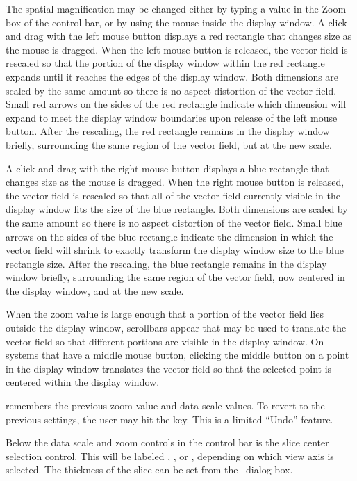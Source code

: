 The spatial magnification may be changed either by typing a value in the
Zoom box of the control bar, or by using the mouse inside the display
window.  A click and drag with the left mouse button displays a red
rectangle that changes size as the mouse is dragged.  When the left
mouse button is released, the vector field is rescaled so that the
portion of the display window within the red rectangle expands until it
reaches the edges of the display window.  Both dimensions are scaled by
the same amount so there is no aspect distortion of the vector field.
Small red arrows on the sides of the red rectangle indicate which
dimension will expand to meet the display window boundaries upon release
of the left mouse button.  After the rescaling, the red rectangle
remains in the display window briefly, surrounding the same region of
the vector field, but at the new scale.

A click and drag with the right mouse button displays a blue rectangle
that changes size as the mouse is dragged.  When the right mouse button
is released, the vector field is rescaled so that all of the vector
field currently visible in the display window fits the size of the
blue rectangle.  Both dimensions are scaled by the same amount so there
is no aspect distortion of the vector field.  Small blue arrows on the
sides of the blue rectangle indicate the dimension in which the vector
field will shrink to exactly transform the display window size to the
blue rectangle size.  After the rescaling, the blue rectangle remains in
the display window briefly, surrounding the same region of the vector
field, now centered in the display window, and at the new scale.

When the zoom value is large enough that a portion of the vector field
lies outside the display window, scrollbars appear that may be used to
translate the vector field so that different portions are visible in the
display window.  On systems that have a middle mouse button, clicking
the middle button on a point in the display window translates the vector
field so that the selected point is centered within the display window.

 remembers the previous zoom value and data scale values.
To revert to the previous settings, the user may hit the  key.
This is a limited ``Undo'' feature.

Below the data scale and zoom controls in the control bar is the slice
center selection control.  This will be
labeled , , or , depending on
which view axis is selected.  The thickness of the slice can be set
from the \ dialog box.

